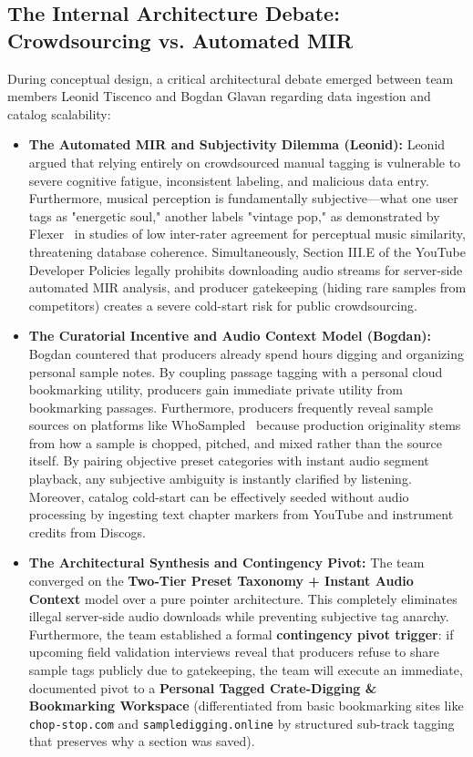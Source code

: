 \subsection*{The Internal Architecture Debate: Crowdsourcing vs. Automated MIR}

During conceptual design, a critical architectural debate emerged between team members Leonid Tiscenco and Bogdan Glavan regarding data ingestion and catalog scalability:
\begin{itemize}
    \item \textbf{The Automated MIR and Subjectivity Dilemma (Leonid):} Leonid argued that relying entirely on crowdsourced manual tagging is vulnerable to severe cognitive fatigue, inconsistent labeling, and malicious data entry. Furthermore, musical perception is fundamentally subjective---what one user tags as "energetic soul," another labels "vintage pop," as demonstrated by Flexer~\cite{ref:flexer2014} in studies of low inter-rater agreement for perceptual music similarity, threatening database coherence. Simultaneously, Section III.E of the YouTube Developer Policies legally prohibits downloading audio streams for server-side automated MIR analysis, and producer gatekeeping (hiding rare samples from competitors) creates a severe cold-start risk for public crowdsourcing.
    \item \textbf{The Curatorial Incentive and Audio Context Model (Bogdan):} Bogdan countered that producers already spend hours digging and organizing personal sample notes. By coupling passage tagging with a personal cloud bookmarking utility, producers gain immediate private utility from bookmarking passages. Furthermore, producers frequently reveal sample sources on platforms like WhoSampled~\cite{ref:whosampled2026} because production originality stems from how a sample is chopped, pitched, and mixed rather than the source itself. By pairing objective preset categories with instant audio segment playback, any subjective ambiguity is instantly clarified by listening. Moreover, catalog cold-start can be effectively seeded without audio processing by ingesting text chapter markers from YouTube and instrument credits from Discogs.
    \item \textbf{The Architectural Synthesis and Contingency Pivot:} The team converged on the \textbf{Two-Tier Preset Taxonomy + Instant Audio Context} model over a pure pointer architecture. This completely eliminates illegal server-side audio downloads while preventing subjective tag anarchy. Furthermore, the team established a formal \textbf{contingency pivot trigger}: if upcoming field validation interviews reveal that producers refuse to share sample tags publicly due to gatekeeping, the team will execute an immediate, documented pivot to a \textbf{Personal Tagged Crate-Digging \& Bookmarking Workspace} (differentiated from basic bookmarking sites like \texttt{chop-stop.com} and \texttt{sampledigging.online} by structured sub-track tagging that preserves why a section was saved).
\end{itemize}

